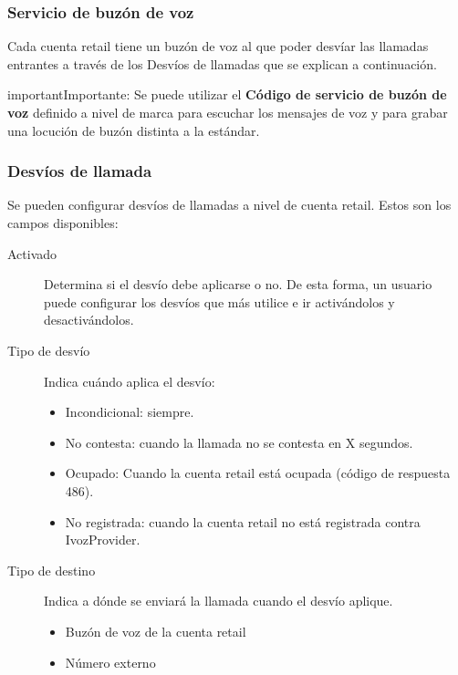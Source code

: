 \documentclass[letterpaper,10pt,spanish]{sphinxmanual}
\begin{document}
\subsubsection{Servicio de buzón de voz}
\label{retail/retail_accounts:voicemail-service}
Cada cuenta retail tiene un buzón de voz al que poder desvíar las llamadas entrantes a través de los Desvíos de llamadas que se explican a continuación.

\begin{notice}{important}{Importante:}
Se puede utilizar el \textbf{Código de servicio de buzón de voz} definido a nivel de marca para escuchar los mensajes de voz y para grabar una locución de buzón distinta a la estándar.
\end{notice}


\subsubsection{Desvíos de llamada}
\label{retail/retail_accounts:call-forward-settings}
Se pueden configurar desvíos de llamadas a nivel de cuenta retail. Estos son los campos disponibles:
\begin{description}
\item[{Activado}] \leavevmode{}\label{retail/retail_accounts:term-enabled}
Determina si el desvío debe aplicarse o no. De esta forma, un usuario puede configurar los desvíos que más utilice e ir activándolos y desactivándolos.

\item[{Tipo de desvío}] \leavevmode{}\label{retail/retail_accounts:term-call-forward-type}
Indica cuándo aplica el desvío:
\begin{itemize}
\item {} 
Incondicional: siempre.

\item {} 
No contesta: cuando la llamada no se contesta en X segundos.

\item {} 
Ocupado: Cuando la cuenta retail está ocupada (código de respuesta 486).

\item {} 
No registrada: cuando la cuenta retail no está registrada contra IvozProvider.

\end{itemize}

\item[{Tipo de destino}] \leavevmode{}\label{retail/retail_accounts:term-target-type}
Indica a dónde se enviará la llamada cuando el desvío aplique.
\begin{itemize}
\item {} 
Buzón de voz de la cuenta retail

\item {} 
Número externo

\end{itemize}

\end{description}
\end{document}
